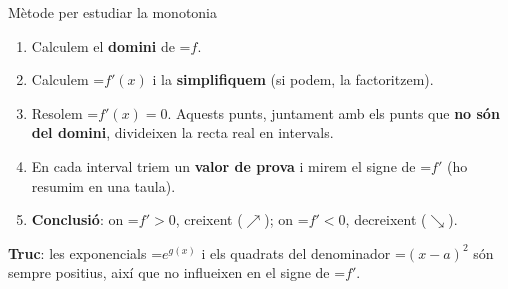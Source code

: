 \documentclass[11pt,a4paper]{article}
\newcommand{\lt}{<}\newcommand{\gt}{>}
\newcommand{\fmm}[1]{\setbox0=\hbox{$#1$}\ifdim\wd0>\linewidth\[#1\]\else\mbox{\box0}\fi}
\newcommand{\fmuline}[1]{\textbf{\color{fmaccent}#1}}
\begin{document}
  
\begin{fmdef}{Mètode per estudiar la monotonia}
\begin{enumerate}
\item Calculem el \textbf{domini} de \fmm{f}.
\item Calculem \fmm{f'(x)} i la \textbf{simplifiquem} (si podem, la factoritzem).
\item Resolem \fmm{f'(x)=0}. Aquests punts, juntament amb els punts que \textbf{no són del domini}, divideixen la recta real en intervals.
\item En cada interval triem un \textbf{valor de prova} i mirem el signe de \fmm{f'} (ho resumim en una taula).
\item \textbf{Conclusió}: on \fmm{f'\gt0}, creixent ($\nearrow$); on \fmm{f'\lt0}, decreixent ($\searrow$).
\end{enumerate}

      
\begin{fmnote}\fmuline{Truc}: les exponencials \fmm{e^{g(x)}} i els quadrats del denominador \fmm{(x-a)^2} són sempre positius, així que no influeixen en el signe de \fmm{f'}.\end{fmnote}
\end{fmdef}
\end{document}

